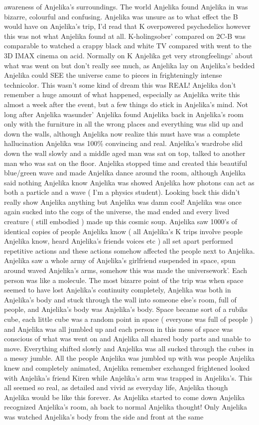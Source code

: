 \documentclass[12pt]{book}
\begin{document}
awareness of Anjelika's surroundings. The world Anjelika found Anjelika in was bizarre, colourful and confusing. Anjelika was unsure as to what effect the B would have on Anjelika's trip, I'd read that K overpowered psychedelics however this was not what Anjelika found at all. K-holingsober' compared on 2C-B was comparable to watched a crappy black and white TV compared with went to the 3D IMAX cinema on acid. Normally on K Anjelika get very strongfeelings' about what was went on but don't really see much, as Anjelika lay on Anjelika's bedded Anjelika could SEE the universe came to pieces in frighteningly intense technicolor. This wasn't some kind of dream this was REAL! Anjelika don't remember a huge amount of what happened, especially as Anjelika write this almost a week after the event, but a few things do stick in Anjelika's mind. Not long after Anjelika wasunder' Anjelika found Anjelika back in Anjelika's room only with the furniture in all the wrong places and everything was slid up and down the walls, although Anjelika now realize this must have was a complete hallucination Anjelika was 100\% convincing and real. Anjelika's wardrobe slid down the wall slowly and a middle aged man was sat on top, talked to another man who was sat on the floor. Anjelika stopped time and created this beautiful blue/green wave and made Anjelika dance around the room, although Anjelika said nothing Anjelika know Anjelika was showed Anjelika how photons can act as both a particle and a wave ( I'm a physics student). Looking back this didn't really show Anjelika anything but Anjelika was damn cool! Anjelika was once again sucked into the cogs of the universe, the mad ended and every lived creature ( still embodied ) made up this cosmic soup. Anjelika saw 1000's of identical copies of people Anjelika know ( all Anjelika's K trips involve people Anjelika know, heard Anjelika's friends voices etc ) all set apart performed repetitive actions and these actions somehow affected the people next to Anjelika. Anjelika saw a whole army of Anjelika's girlfriend suspended in space, spun around waved Anjelika's arms, somehow this was made the universework'. Each person was like a molecule. The most bizarre point of the trip was when space seemed to have lost Anjelika's continuity completely, Anjelika was both in Anjelika's body and stuck through the wall into someone else's room, full of people, and Anjelika's body was Anjelika's body. Space became sort of a rubiks cube, each little cube was a random point in space ( everyone was full of people ) and Anjelika was all jumbled up and each person in this mess of space was conscious of what was went on and Anjelika all shared body parts and unable to move. Everything shifted slowly and Anjelika was all sucked through the cubes in a messy jumble. All the people Anjelika was jumbled up with was people Anjelika knew and completely animated, Anjelika remember exchanged frightened looked with Anjelika's friend Kiren while Anjelika's arm was trapped in Anjelika's. This all seemed so real, as detailed and vivid as everyday life, Anjelika though Anjelika would be like this forever. As Anjelika started to come down Anjelika recognized Anjelika's room, ah back to normal Anjelika thought! Only Anjelika was watched Anjelika's body from the side and front at the same 
\end{document}
